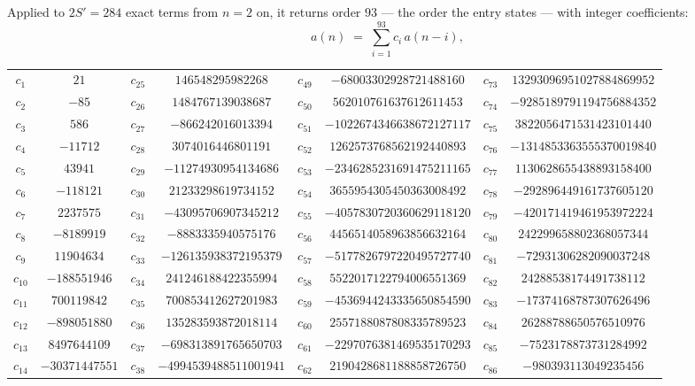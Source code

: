 \documentclass[11pt,a4paper]{article}
\theoremstyle{plain}
\theoremstyle{definition}
\begin{document}
Applied to $2S'=284$ exact terms from $n=2$ on, it returns order $93$ --- the
order the entry states --- with integer coefficients:
\[
a(n)\;=\;\sum_{i=1}^{93}c_i\,a(n-i),
\]
\begin{center}\small
\begin{tabular}{cccccccc}
$c_{1}$ & $21$ & $c_{25}$ & $146548295982268$ & $c_{49}$ & $-68003302928721488160$ & $c_{73}$ & $13293096951027884869952$ \\
$c_{2}$ & $-85$ & $c_{26}$ & $1484767139038687$ & $c_{50}$ & $562010761637612611453$ & $c_{74}$ & $-9285189791194756884352$ \\
$c_{3}$ & $586$ & $c_{27}$ & $-866242016013394$ & $c_{51}$ & $-1022674346638672127117$ & $c_{75}$ & $3822056471531423101440$ \\
$c_{4}$ & $-11712$ & $c_{28}$ & $3074016446801191$ & $c_{52}$ & $1262573768562192440893$ & $c_{76}$ & $-1314853363555370019840$ \\
$c_{5}$ & $43941$ & $c_{29}$ & $-11274930954134686$ & $c_{53}$ & $-2346285231691475211165$ & $c_{77}$ & $1130628655438893158400$ \\
$c_{6}$ & $-118121$ & $c_{30}$ & $21233298619734152$ & $c_{54}$ & $3655954305450363008492$ & $c_{78}$ & $-292896449161737605120$ \\
$c_{7}$ & $2237575$ & $c_{31}$ & $-43095706907345212$ & $c_{55}$ & $-4057830720360629118120$ & $c_{79}$ & $-420171419461953972224$ \\
$c_{8}$ & $-8189919$ & $c_{32}$ & $-8883335940575176$ & $c_{56}$ & $4456514058963856632164$ & $c_{80}$ & $242299658802368057344$ \\
$c_{9}$ & $11904634$ & $c_{33}$ & $-126135938372195379$ & $c_{57}$ & $-5177826797220495727740$ & $c_{81}$ & $-72931306282090037248$ \\
$c_{10}$ & $-188551946$ & $c_{34}$ & $241246188422355994$ & $c_{58}$ & $5522017122794006551369$ & $c_{82}$ & $24288538174491738112$ \\
$c_{11}$ & $700119842$ & $c_{35}$ & $700853412627201983$ & $c_{59}$ & $-4536944243335650854590$ & $c_{83}$ & $-17374168787307626496$ \\
$c_{12}$ & $-898051880$ & $c_{36}$ & $135283593872018114$ & $c_{60}$ & $2557188087808335789523$ & $c_{84}$ & $26288788650576510976$ \\
$c_{13}$ & $8497644109$ & $c_{37}$ & $-698313891765650703$ & $c_{61}$ & $-2297076381469535170293$ & $c_{85}$ & $-7523178873731284992$ \\
$c_{14}$ & $-30371447551$ & $c_{38}$ & $-4994539488511001941$ & $c_{62}$ & $2190428681188858726750$ & $c_{86}$ & $-980393113049235456$ \\

\end{tabular}
\end{center}
\end{document}
